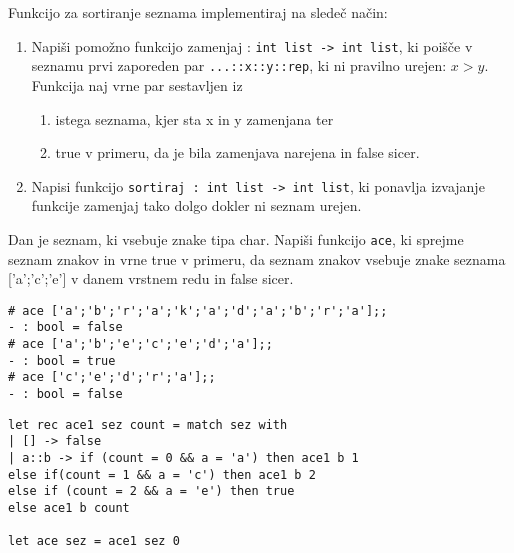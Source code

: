 \begin{ex}
Funkcijo za sortiranje seznama implementiraj na slede\v c na\v cin:

\begin{enumerate}
\item Napi\v si pomo\v zno funkcijo zamenjaj : \lstinline{int list -> int list}, ki poi\v s\v ce v seznamu prvi zaporeden par \lstinline{...::x::y::rep}, ki ni pravilno urejen: $x>y$. Funkcija naj vrne par sestavljen iz 
	\begin{enumerate}
	\item istega seznama, kjer sta x in y zamenjana ter 
    \item true v primeru, da je bila zamenjava narejena in false sicer.
	\end{enumerate}
    \item Napisi funkcijo \lstinline{sortiraj : int list -> int list}, ki ponavlja izvajanje funkcije zamenjaj tako dolgo dokler ni seznam urejen.
\end{enumerate}
\end{ex}
\begin{ex}
Dan je seznam, ki vsebuje znake tipa char. Napi\v si funkcijo \lstinline{ace}, ki sprejme seznam znakov in vrne true v primeru, da seznam znakov vsebuje znake seznama ['a';'c';'e'] v danem vrstnem redu in false sicer. 

\begin{lstlisting}
# ace ['a';'b';'r';'a';'k';'a';'d';'a';'b';'r';'a'];;
- : bool = false
# ace ['a';'b';'e';'c';'e';'d';'a'];;
- : bool = true
# ace ['c';'e';'d';'r';'a'];;
- : bool = false
\end{lstlisting}

\begin{sol}
\begin{lstlisting}
let rec ace1 sez count = match sez with
| [] -> false
| a::b -> if (count = 0 && a = 'a') then ace1 b 1
else if(count = 1 && a = 'c') then ace1 b 2
else if (count = 2 && a = 'e') then true
else ace1 b count

let ace sez = ace1 sez 0
\end{lstlisting}
\end{sol}

\end{ex}



